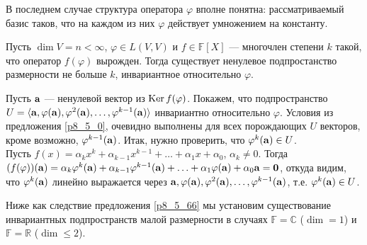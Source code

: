 В последнем случае структура оператора $\varphi$ вполне понятна: рассматриваемый  базис таков, что
на каждом из них $\varphi$ действует умножением на константу. 


\begin{predl}\label{p8_5_66}
Пусть  $\dim V = n <\infty $, $\varphi \in L(V,V)$ и $f\in \mathbb{F}[X]$  
--- многочлен степени $k$ такой, что оператор $f(\varphi)$ вырожден.
Тогда существует ненулевое подпростанство размерности не больше $k$, инвариантное относительно $\varphi$.
\end{predl}
\dok Пусть $\mathbf{a}$ --- ненулевой вектор из $\mathop{\rm Ker}\nolimits f(\varphi)$.
Покажем, что подпространство $U = \langle \mathbf{a}, \varphi(\mathbf{a}), \varphi ^2(\mathbf{a}), \ldots , 
\varphi ^{k-1}(\mathbf{a}) \rangle$ инвариантно относительно $\varphi$.
Условия из  предложения \ref{p8_5_0}, очевидно выполнены для всех порождающих $U$ 
векторов, кроме возможно, $\varphi ^{k-1}(\mathbf{a})$. Итак, 
нужно проверить, что $\varphi ^{k}(\mathbf{a}) \in U$. \\
Пусть $f(x) = \alpha _k x^k + \alpha _{k-1} x^{k-1} + \ldots  + \alpha _{1} x + \alpha _0$, $\alpha_k\neq 0$.
Тогда \\ $(f(\varphi))(\mathbf{a}) = 
\alpha _k \varphi ^k (\mathbf{a}) + \alpha _{k-1} \varphi ^{k-1} (\mathbf{a})
+ \ldots  + \alpha _{1} \varphi (\mathbf{a}) + \alpha _0 \mathbf{a} = \mathbf{0}$, 
откуда видим, что $\varphi ^k (\mathbf{a})$
линейно выражается через $\mathbf{a}, \varphi(\mathbf{a}), \varphi ^2(\mathbf{a}), \ldots , 
\varphi ^{k-1}(\mathbf{a})$, т.е.  $\varphi ^k (\mathbf{a})\in U$.
\edok


\otstup

Ниже как следствие предложения \ref{p8_5_66} мы установим существование инвариантных подпространств
малой размерности в случаях $\mathbb{F}=\mathbb{C}$ ($\dim =1$) и $\mathbb{F}=\mathbb{R}$ ($\dim \leq 2$).


